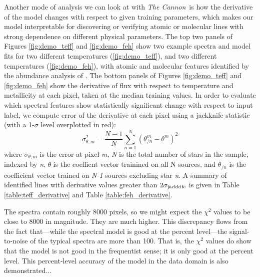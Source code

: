 \documentclass[modern]{aastex62}
\newcommand{\thecannon}{\textsl{The Cannon}}
\begin{document}
Another mode of analysis we can look at with \thecannon\ is how the derivative of the model changes with respect to given training parameters, which makes our model interpretable for discovering or verifying atomic or molecular lines with strong dependence on different physical parameters. The top two panels of Figures \ref{fig:demo_teff} and \ref{fig:demo_feh} show two example spectra and model fits for two different temperatures (\ref{fig:demo_teff}), and two different temperatures (\ref{fig:demo_feh}), with atomic and molecular features identified by the abundance analysis of \citealt{Souto:2017}. The bottom panels of Figures \ref{fig:demo_teff} and \ref{fig:demo_feh} show the derivative of flux with respect to temperature and metallicity at each pixel, taken at the median training values. In order to evaluate which spectral features show statistically significant change with respect to input label, we compute error of the derivative at each pixel using a jackknife statistic (with a 1-$\sigma$ level overplotted in red):
\begin{equation}
	\sigma_{\theta,m}^2 = \frac{N-1}{N} \sum^N_{n=1} (\theta_{/n}^m - \theta^m)^2 
\end{equation}
where $\sigma_{\theta,m}$ is the error at pixel \emph{m}, \emph{N} is the total number of stars in the sample, indexed by \emph{n}, $\theta$ is the coeffient vector trainined on all N sources, and $\theta_{/n}$ is the coefficient vector trained on \emph{N-1} sources excluding star \emph{n}. A summary of identified lines with derivative values greater than $2\sigma_{\rm jackkife}$ is given in Table \ref{table:teff_derivative} and Table \ref{table:feh_derivative}.

The spectra contain roughly 8000 pixels,
so we might expect the $\chi^2$ values to be close to 8000 in magnitude.
They are much higher.
This discrepancy flows from the fact that---while the spectral model is good at the percent
level---the signal-to-noise of the typical spectra are more than 100.
That is, the $\chi^2$ values do show that the model is not good in the frequentist
sense; it is only good at the percent level.
This percent-level accuracy of the model in the data domain is also demonstrated... \\

\color{gcolor}{BIRKY: Can you demonstrate this by showing the RMS residuals, putting it in as a figure, and putting this paragraph back to me? I am imagining a figure that shows a scatter plot of T vs RMS residual, colored by metallicity. Or something like that.}\color{black} \\
\end{document}
